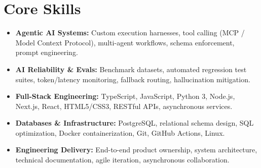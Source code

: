 \documentclass[a4paper,10pt]{article}
\begin{document}
\section{Core Skills}
\begin{itemize}
  \item \textbf{Agentic AI Systems:} Custom execution harnesses, tool calling (MCP / Model Context Protocol), multi-agent workflows, schema enforcement, prompt engineering.
  \item \textbf{AI Reliability \& Evals:} Benchmark datasets, automated regression test suites, token/latency monitoring, fallback routing, hallucination mitigation.
  \item \textbf{Full-Stack Engineering:} TypeScript, JavaScript, Python 3, Node.js, Next.js, React, HTML5/CSS3, RESTful APIs, asynchronous services.
  \item \textbf{Databases \& Infrastructure:} PostgreSQL, relational schema design, SQL optimization, Docker containerization, Git, GitHub Actions, Linux.
  \item \textbf{Engineering Delivery:} End-to-end product ownership, system architecture, technical documentation, agile iteration, asynchronous collaboration.
\end{itemize}
\end{document}
